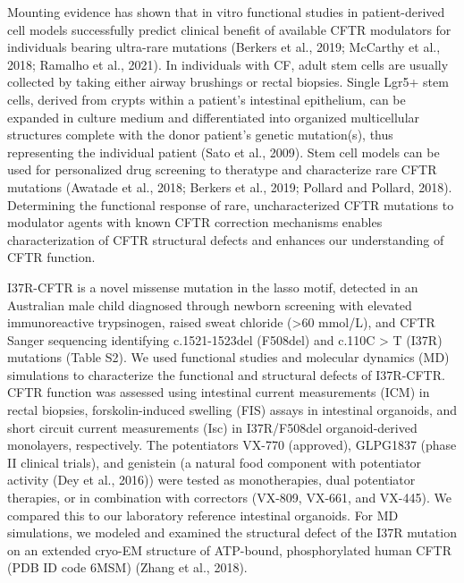 Mounting evidence has shown that in vitro functional studies in patient-derived cell models successfully predict clinical benefit of available CFTR modulators for individuals bearing ultra-rare mutations (Berkers et al., 2019; McCarthy et al., 2018; Ramalho et al., 2021). In individuals with CF, adult stem cells are usually collected by taking either airway brushings or rectal biopsies. Single Lgr5+ stem cells, derived from crypts within a patient's intestinal epithelium, can be expanded in culture medium and differentiated into organized multicellular structures complete with the donor patient's genetic mutation(s), thus representing the individual patient (Sato et al., 2009). Stem cell models can be used for personalized drug screening to theratype and characterize rare CFTR mutations (Awatade et al., 2018; Berkers et al., 2019; Pollard and Pollard, 2018). Determining the functional response of rare, uncharacterized CFTR mutations to modulator agents with known CFTR correction mechanisms enables characterization of CFTR structural defects and enhances our understanding of CFTR function.

I37R-CFTR is a novel missense mutation in the lasso motif, detected in an Australian male child diagnosed through newborn screening with elevated immunoreactive trypsinogen, raised sweat chloride (>60 mmol/L), and CFTR Sanger sequencing identifying c.1521-1523del (F508del) and c.110C > T (I37R) mutations (Table S2). We used functional studies and molecular dynamics (MD) simulations to characterize the functional and structural defects of I37R-CFTR. CFTR function was assessed using intestinal current measurements (ICM) in rectal biopsies, forskolin-induced swelling (FIS) assays in intestinal organoids, and short circuit current measurements (Isc) in I37R/F508del organoid-derived monolayers, respectively. The potentiators VX-770 (approved), GLPG1837 (phase II clinical trials), and genistein (a natural food component with potentiator activity (Dey et al., 2016)) were tested as monotherapies, dual potentiator therapies, or in combination with correctors (VX-809, VX-661, and VX-445). We compared this to our laboratory reference intestinal organoids. For MD simulations, we modeled and examined the structural defect of the I37R mutation on an extended cryo-EM structure of ATP-bound, phosphorylated human CFTR (PDB ID code 6MSM) (Zhang et al., 2018).
